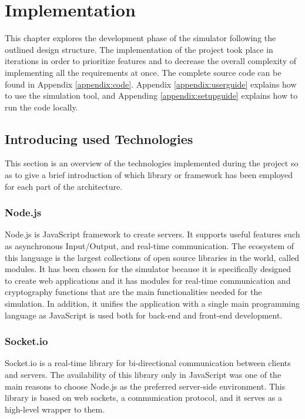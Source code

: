 \chapter{Implementation}
This chapter explores the development phase of the simulator following the outlined design structure. The implementation of the project took place in iterations in order to prioritize features and to decrease the overall complexity of implementing all the requirements at once. The complete source code can be found in Appendix \ref{appendix:code}. Appendix \ref{appendix:userguide} explains how to use the simulation tool, and Appending \ref{appendix:setupguide} explains how to run the code locally.


\section{Introducing used Technologies}
This section is an overview of the technologies implemented during the project so as to give a brief introduction of which library or framework has been employed for each part of the architecture.


\subsection{Node.js}
Node.js is JavaScript framework to create servers. It supports useful features such as asynchronous Input/Output, and real-time communication. The ecosystem of this language is the largest collections of open source libraries in the world, called modules. It has been chosen for the simulator because it is specifically designed to create web applications and it has modules for real-time communication and cryptography functions that are the main functionalities needed for the simulation. In addition, it unifies the application with a single main programming language as JavaScript is used both for back-end and front-end development. 


\subsection{Socket.io}
Socket.io is a real-time library for bi-directional communication between clients and servers. The availability of this library only in JavaScript was one of the main reasons to choose Node.js as the preferred server-side environment. This library is based on web sockets, a communication protocol, and it serves as a high-level wrapper to them.

